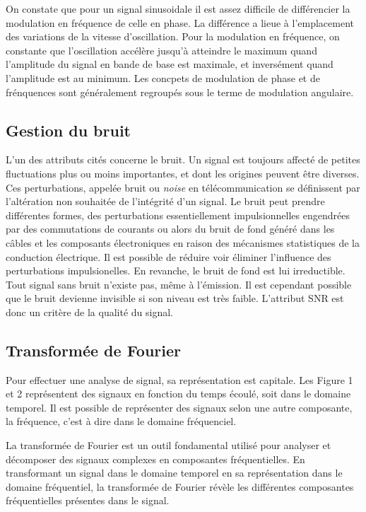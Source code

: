 On constate que pour un signal sinusoidale il est assez difficile de différencier la modulation en fréquence de celle en phase. La différence a lieue à l'emplacement des variations de la vitesse d'oscillation. Pour la modulation en fréquence, on constante que l'oscillation accélère jusqu'à atteindre le maximum quand l'amplitude du signal en bande de base est maximale, et inversément quand l'amplitude est au minimum. Les concpets de modulation de phase et de frénquences sont généralement regroupés sous le terme de modulation angulaire.


\subsection{Gestion du bruit}

L'un des attributs cités concerne le bruit. Un signal est toujours affecté de petites fluctuations plus ou moins importantes, et dont les origines peuvent être diverses. Ces perturbations, appelée bruit ou \textit{noise} en télécommunication se définissent par l'altération non souhaitée de l'intégrité d'un signal. Le bruit peut prendre différentes formes, des perturbations essentiellement impulsionnelles engendrées par des commutations de courants ou alors du bruit de fond généré dans les câbles et les composants électroniques en raison
des mécanismes statistiques de la conduction électrique. Il est possible de réduire voir éliminer l'influence des perturbations impulsionelles. En revanche, le bruit de fond est lui irreductible. Tout signal sans bruit n'existe pas, même à l'émission. Il est cependant possible que le bruit devienne invisible si son niveau est très faible. L'attribut SNR est donc un critère de la qualité du signal.


\subsection{Transformée de Fourier}

Pour effectuer une analyse de signal, sa représentation est capitale. Les Figure 1 et 2 représentent des signaux en fonction du temps écoulé, soit dans le domaine temporel. Il est possible de représenter des signaux selon une autre composante, la fréquence, c'est à dire dans le domaine fréquenciel.

\vspace{0.1cm}

La transformée de Fourier est un outil fondamental utilisé pour analyser et décomposer des signaux complexes en composantes fréquentielles. En transformant un signal dans le domaine temporel en sa représentation dans le domaine fréquentiel, la transformée de Fourier révèle les différentes composantes fréquentielles présentes dans le signal.

